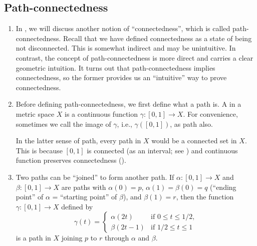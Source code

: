 \subsection{Path-connectedness}
\label{subsect:path-conn}
\begin{enumerate}
\item In , we will discuss another notion of
``connectedness'', which is called path-connectedness. Recall that we have
defined connectedness as a state of being not disconnected. This is somewhat
indirect and may be unintuitive. In contrast, the concept of path-connectedness
is more direct and carries a clear geometric intuition. It turns out that
path-connectedness implies connectedness, so the former provides us an
``intuitive'' way to prove connectedness.

\item Before defining path-connectedness, we first define what a path is. A
 in a metric space \(X\) is a continuous function \(\gamma:[0,1]\to
X\). For convenience, sometimes we call the image of \(\gamma\), i.e.,
\(\gamma([0,1])\), as path also.

In the latter sense of path, every path in \(X\) would be a connected set in
\(X\). This is because \([0,1]\) is connected (as an interval; see
) and continuous function preserves connectedness
().

\item Two paths can be ``joined'' to form another path. If \(\alpha:[0,1]\to
X\) and \(\beta:[0,1]\to X\) are paths with \(\alpha(0)=p\),
\(\alpha(1)=\beta(0)=q\) (``ending point'' of \(\alpha\) = ``starting point''
of \(\beta\)), and \(\beta(1)=r\), then the function \(\gamma:[0,1]\to X\)
defined by
\[
\gamma(t)=\begin{cases}
\alpha(2t)&\text{if \(0\le t\le 1/2\)},\\
\beta(2t-1)&\text{if \(1/2\le t\le 1\)}
\end{cases}
\]
is a path in \(X\) joining \(p\) to \(r\) through \(\alpha\) and \(\beta\).
\begin{center}
\end{center}


\end{enumerate}
